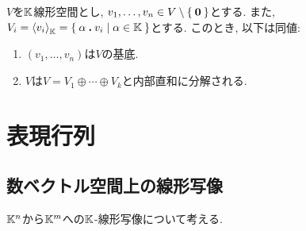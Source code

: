 \begin{prop}
  $V$を$\mathbb{K}$線形空間とし,
  $v_1,\ldots, v_n\in V\setminus\Set{\boldsymbol{0}}$とする.
  また,
  $V_i=\Braket{v_i}_{\mathbb{K}}=\Set{\alpha \mathbin{\boldsymbol{.}}v_i|\alpha \in\mathbb{K}}$とする.
  このとき, 以下は同値:
  \begin{enumerate}
  \item $(v_1,\ldots, v_n)$は$V$の基底.
  \item $V$は$V=V_1\oplus\cdots \oplus V_k$と内部直和に分解される.
  \end{enumerate}
\end{prop}

\begin{quiz}
\end{quiz}




\chapter{表現行列}
\section{数ベクトル空間上の線形写像}
$\mathbb{K}^n$から$\mathbb{K}^m$への$\mathbb{K}$-線形写像について考える.

